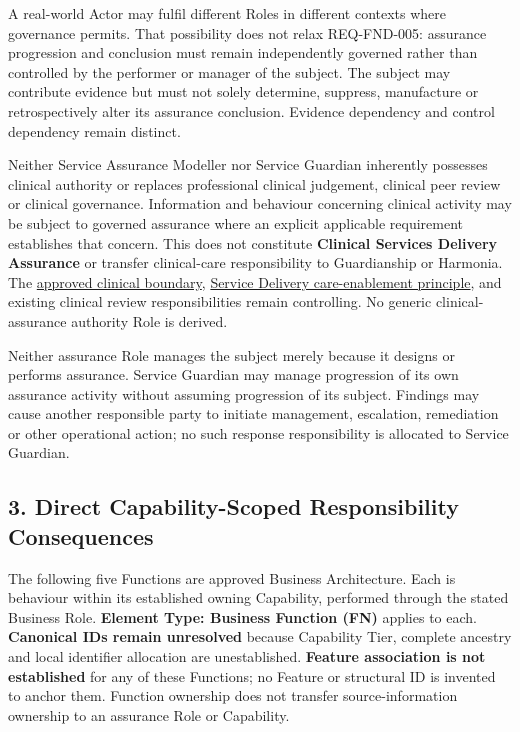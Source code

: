 \label{rad:assurance:54}

A real-world Actor may fulfil different Roles in different contexts where governance permits. That possibility does not relax REQ-FND-005: assurance progression and conclusion must remain independently governed rather than controlled by the performer or manager of the subject. The subject may contribute evidence but must not solely determine, suppress, manufacture or retrospectively alter its assurance conclusion. Evidence dependency and control dependency remain distinct.

\label{rad:assurance:56}

Neither Service Assurance Modeller nor Service Guardian inherently possesses clinical authority or replaces professional clinical judgement, clinical peer review or clinical governance. Information and behaviour concerning clinical activity may be subject to governed assurance where an explicit applicable requirement establishes that concern. This does not constitute \textbf{Clinical Services Delivery Assurance} or transfer clinical-care responsibility to Guardianship or Harmonia. The \hyperref[rad:enabling:763]{approved clinical boundary}, \hyperref[rad:sd:9]{Service Delivery care-enablement principle}, and existing clinical review responsibilities remain controlling. No generic clinical-assurance authority Role is derived.

\label{rad:assurance:58}

Neither assurance Role manages the subject merely because it designs or performs assurance. Service Guardian may manage progression of its own assurance activity without assuming progression of its subject. Findings may cause another responsible party to initiate management, escalation, remediation or other operational action; no such response responsibility is allocated to Service Guardian.

\label{rad:assurance:60}
\subsection*{3. Direct Capability-Scoped Responsibility Consequences}
\label{rad:assurance:62}

The following five Functions are approved Business Architecture. Each is behaviour within its established owning Capability, performed through the stated Business Role. \textbf{Element Type: Business Function (FN)} applies to each. \textbf{Canonical IDs remain unresolved} because Capability Tier, complete ancestry and local identifier allocation are unestablished. \textbf{Feature association is not established} for any of these Functions; no Feature or structural ID is invented to anchor them. Function ownership does not transfer source-information ownership to an assurance Role or Capability.

